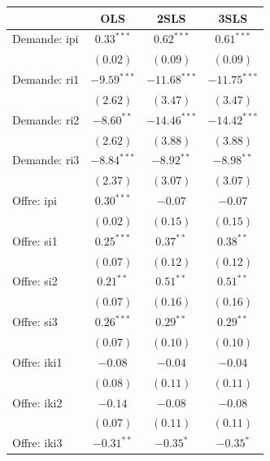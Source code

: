 \documentclass[11pt,]{article}
\begin{document}
\begin{table}[!htbp]
\begin{center}
\begin{tabular}{l c c c }
\hline
 & OLS & 2SLS & 3SLS \\
\hline
Demande: ipi        & $0.33^{***}$  & $0.62^{***}$   & $0.61^{***}$   \\
                    & $(0.02)$      & $(0.09)$       & $(0.09)$       \\
Demande: ri1        & $-9.59^{***}$ & $-11.68^{***}$ & $-11.75^{***}$ \\
                    & $(2.62)$      & $(3.47)$       & $(3.47)$       \\
Demande: ri2        & $-8.60^{**}$  & $-14.46^{***}$ & $-14.42^{***}$ \\
                    & $(2.62)$      & $(3.88)$       & $(3.88)$       \\
Demande: ri3        & $-8.84^{***}$ & $-8.92^{**}$   & $-8.98^{**}$   \\
                    & $(2.37)$      & $(3.07)$       & $(3.07)$       \\
Offre: ipi          & $0.30^{***}$  & $-0.07$        & $-0.07$        \\
                    & $(0.02)$      & $(0.15)$       & $(0.15)$       \\
Offre: si1          & $0.25^{***}$  & $0.37^{**}$    & $0.38^{**}$    \\
                    & $(0.07)$      & $(0.12)$       & $(0.12)$       \\
Offre: si2          & $0.21^{**}$   & $0.51^{**}$    & $0.51^{**}$    \\
                    & $(0.07)$      & $(0.16)$       & $(0.16)$       \\
Offre: si3          & $0.26^{***}$  & $0.29^{**}$    & $0.29^{**}$    \\
                    & $(0.07)$      & $(0.10)$       & $(0.10)$       \\
Offre: iki1         & $-0.08$       & $-0.04$        & $-0.04$        \\
                    & $(0.08)$      & $(0.11)$       & $(0.11)$       \\
Offre: iki2         & $-0.14$       & $-0.08$        & $-0.08$        \\
                    & $(0.07)$      & $(0.11)$       & $(0.11)$       \\
Offre: iki3         & $-0.31^{**}$  & $-0.35^{*}$    & $-0.35^{*}$    \\

\end{tabular}
\end{center}
\end{table}
\end{document}
